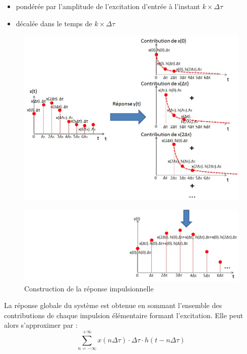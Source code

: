\documentclass[]{report}
\begin{document}
	\begin{itemize}
		\item pondérée par l'amplitude de l'excitation d'entrée à l'instant $ k \times \Delta \tau $
	
		\item décalée dans le temps de $ k \times \Delta \tau $~
	\end{itemize}
	\begin{figure}[h!]
		\centering
		\includegraphics[scale=0.5]{images/illustration_reponse_impuls.jpg} 
	\end{figure}
	\begin{figure}[h!]
		\centering
		\includegraphics[scale=0.6]{images/illustration_reponse_impuls_2.jpg}
		\caption{Construction de la réponse impulsionnelle}	
		\label{Fig:illustration_reponse_impuls_2} 
	\end{figure}

	La réponse globale du système est obtenue en sommant l'ensemble des contributions de chaque impulsion élémentaire formant l'excitation. Elle peut alors s'approximer par : 
	\begin{equation*}\label{key}
	\sum_{n=-\infty}^{+\infty} x(n\Delta \tau) \cdot \Delta \tau \cdot h(t-n\Delta \tau)
	\end{equation*}
	
\end{document}
